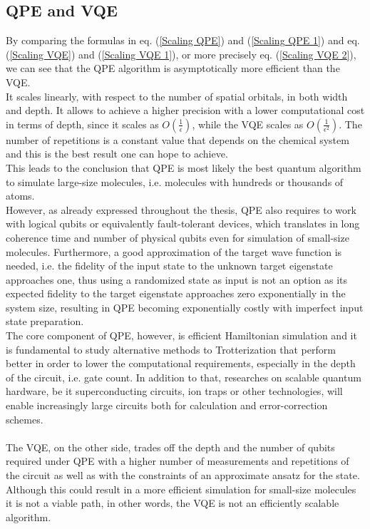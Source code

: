 \subsection{QPE and VQE}
By comparing the formulas in eq. (\ref{Scaling QPE}) and (\ref{Scaling QPE 1}) and eq. (\ref{Scaling VQE}) and (\ref{Scaling VQE 1}), or more precisely eq. (\ref{Scaling VQE 2}), we can see that the QPE algorithm is asymptotically more efficient than the VQE. \\
It scales linearly, with respect to the number of spatial orbitals, in both width and depth. It allows to achieve a higher precision with a lower computational cost in terms of depth, since it scales as $O(\frac{1}{\epsilon})$, while the VQE scales as $O(\frac{1}{\epsilon^2})$. The number of repetitions is a constant value that depends on the chemical system and this is the best result one can hope to achieve. \\
This leads to the conclusion that QPE is most likely the best quantum algorithm to simulate large-size molecules, i.e. molecules with hundreds or thousands of atoms. \\
However, as already expressed throughout the thesis, QPE also requires to work with logical qubits or equivalently fault-tolerant devices, which translates in long coherence time and number of physical qubits even for simulation of small-size molecules. Furthermore, a good approximation of the target wave function is needed, i.e. the fidelity of the input state to the unknown target eigenstate approaches one, thus using a randomized state as input is not an option as its expected fidelity to the target eigenstate approaches zero exponentially in the system size, resulting in QPE becoming exponentially costly with imperfect input state preparation. \\
The core component of QPE, however, is efficient Hamiltonian simulation and it is fundamental to study alternative methods to Trotterization that perform better in order to lower the computational requirements, especially in the depth of the circuit, i.e. gate count. In addition to that, researches on scalable quantum hardware, be it superconducting circuits, ion traps or other technologies, will enable increasingly large circuits both for calculation and error-correction schemes. \\
\\
The VQE, on the other side, trades off the depth and the number of qubits required under QPE with a higher number of measurements and repetitions of the circuit as well as with the constraints of an approximate ansatz for the state. Although this could result in a more efficient simulation for small-size molecules it is not a viable path, in other words, the VQE is not an efficiently scalable algorithm. \\
